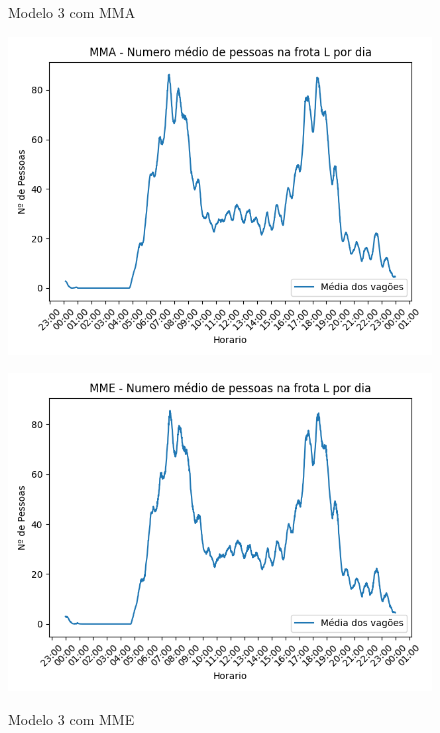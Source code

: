 \documentclass[acronym,symbols,table]{fei}
\begin{document}
\begin{figure}[!htb]
	\centering
	\begin{minipage}{0.5\textwidth}
		\caption{Modelo 3 com MMA}
		    \includegraphics[width=1\linewidth]{Imagens/MMA_-_Numero_medio_de_pessoas_na_frota_L_por_dia.png}
    \label{fig:mmamodelo3}
	\end{minipage}\hfill
	\begin{minipage}{0.5\textwidth}
		\caption{Modelo 3 com MME}
		    \includegraphics[width=1\linewidth]{Imagens/MME_-_Numero_medio_de_pessoas_na_frota_L_por_dia.png}
    \label{fig:mmemodelo3}
	\end{minipage}
\end{figure}
\end{document}
